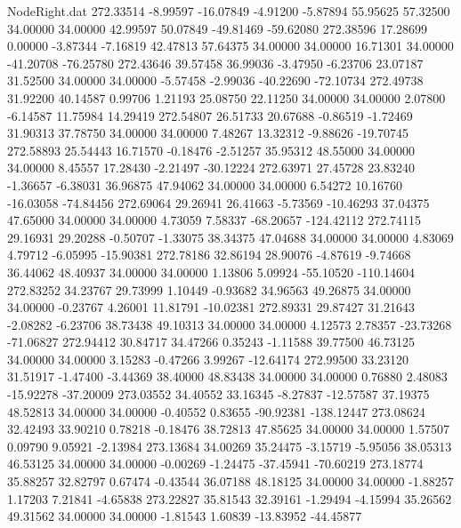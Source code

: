 \begin{filecontents}{NodeRight.dat}
 272.33514   -8.99597  -16.07849    -4.91200   -5.87894   55.95625   57.32500   34.00000   34.00000   42.99597   50.07849  -49.81469  -59.62080
 272.38596   17.28699    0.00000    -3.87344   -7.16819   42.47813   57.64375   34.00000   34.00000   16.71301   34.00000  -41.20708  -76.25780
 272.43646   39.57458   36.99036    -3.47950   -6.23706   23.07187   31.52500   34.00000   34.00000   -5.57458   -2.99036  -40.22690  -72.10734
 272.49738   31.92200   40.14587     0.99706    1.21193   25.08750   22.11250   34.00000   34.00000    2.07800   -6.14587   11.75984   14.29419
 272.54807   26.51733   20.67688    -0.86519   -1.72469   31.90313   37.78750   34.00000   34.00000    7.48267   13.32312   -9.88626  -19.70745
 272.58893   25.54443   16.71570    -0.18476   -2.51257   35.95312   48.55000   34.00000   34.00000    8.45557   17.28430   -2.21497  -30.12224
 272.63971   27.45728   23.83240    -1.36657   -6.38031   36.96875   47.94062   34.00000   34.00000    6.54272   10.16760  -16.03058  -74.84456
 272.69064   29.26941   26.41663    -5.73569  -10.46293   37.04375   47.65000   34.00000   34.00000    4.73059    7.58337  -68.20657 -124.42112
 272.74115   29.16931   29.20288    -0.50707   -1.33075   38.34375   47.04688   34.00000   34.00000    4.83069    4.79712   -6.05995  -15.90381
 272.78186   32.86194   28.90076    -4.87619   -9.74668   36.44062   48.40937   34.00000   34.00000    1.13806    5.09924  -55.10520 -110.14604
 272.83252   34.23767   29.73999     1.10449   -0.93682   34.96563   49.26875   34.00000   34.00000   -0.23767    4.26001   11.81791  -10.02381
 272.89331   29.87427   31.21643    -2.08282   -6.23706   38.73438   49.10313   34.00000   34.00000    4.12573    2.78357  -23.73268  -71.06827
 272.94412   30.84717   34.47266     0.35243   -1.11588   39.77500   46.73125   34.00000   34.00000    3.15283   -0.47266    3.99267  -12.64174
 272.99500   33.23120   31.51917    -1.47400   -3.44369   38.40000   48.83438   34.00000   34.00000    0.76880    2.48083  -15.92278  -37.20009
 273.03552   34.40552   33.16345    -8.27837  -12.57587   37.19375   48.52813   34.00000   34.00000   -0.40552    0.83655  -90.92381 -138.12447
 273.08624   32.42493   33.90210     0.78218   -0.18476   38.72813   47.85625   34.00000   34.00000    1.57507    0.09790    9.05921   -2.13984
 273.13684   34.00269   35.24475    -3.15719   -5.95056   38.05313   46.53125   34.00000   34.00000   -0.00269   -1.24475  -37.45941  -70.60219
 273.18774   35.88257   32.82797     0.67474   -0.43544   36.07188   48.18125   34.00000   34.00000   -1.88257    1.17203    7.21841   -4.65838
 273.22827   35.81543   32.39161    -1.29494   -4.15994   35.26562   49.31562   34.00000   34.00000   -1.81543    1.60839  -13.83952  -44.45877

\end{filecontents}
